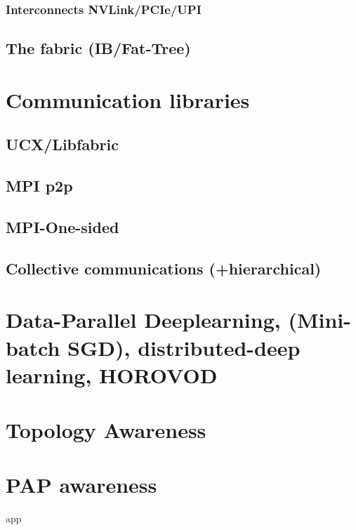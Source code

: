     \subsubsection{Interconnects NVLink/PCIe/UPI}
    \subsection{The fabric (IB/Fat-Tree)}
\section{Communication libraries} 
\cite{mpi40, gabriel2004OpenMPI, MPICH, shamis2015ucx}
    \subsection{UCX/Libfabric}
    \subsection{MPI p2p}
    \subsection{MPI-One-sided}
    \subsection{Collective communications (+hierarchical)}
\section{Data-Parallel Deeplearning, (Mini-batch SGD), distributed-deep learning, HOROVOD}
\cite{Ben-Nun2019DemystifyDL, Sergeev2018Horovod}
\section{Topology Awareness}
\section{PAP awareness}

app